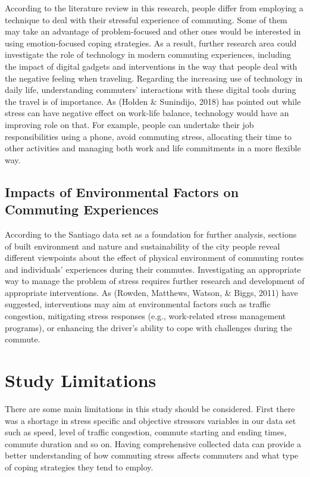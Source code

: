 \documentclass[
11pt, %
oneside, %
english, %
singlespacing, %
]{macthesis} %
\begin{document}
According to the literature review in this research, people differ from employing a technique to deal with their stressful experience of commuting. Some of them may take an advantage of problem-focused and other ones would be interested in using emotion-focused coping strategies. As a result, further research area could investigate the role of technology in modern commuting experiences, including the impact of digital gadgets and interventions in the way that people deal with the negative feeling when traveling. Regarding the increasing use of technology in daily life, understanding commuters' interactions with these digital tools during the travel is of importance. As (Holden \& Sunindijo, 2018) has pointed out while stress can have negative effect on work-life balance, technology would have an improving role on that. For example, people can undertake their job responsibilities using a phone, avoid commuting stress, allocating their time to other activities and managing both work and life commitments in a more flexible way.

\hypertarget{impacts-of-environmental-factors-on-commuting-experiences}{%
\subsection{Impacts of Environmental Factors on Commuting Experiences}\label{impacts-of-environmental-factors-on-commuting-experiences}}

According to the Santiago data set as a foundation for further analysis, sections of built environment and nature and sustainability of the city people reveal different viewpoints about the effect of physical environment of commuting routes and individuals' experiences during their commutes. Investigating an appropriate way to manage the problem of stress requires further research and development of appropriate interventions. As (Rowden, Matthews, Watson, \& Biggs, 2011) have suggested, interventions may aim at environmental factors such as traffic congestion, mitigating stress responses (e.g., work-related stress management programs), or enhancing the driver's ability to cope with challenges during the commute.

\hypertarget{study-limitations}{%
\section{Study Limitations}\label{study-limitations}}

There are some main limitations in this study should be considered. First there was a shortage in stress specific and objective stressors variables in our data set such as speed, level of traffic congestion, commute starting and ending times, commute duration and so on. Having comprehensive collected data can provide a better understanding of how commuting stress affects commuters and what type of coping strategies they tend to employ.
\end{document}
